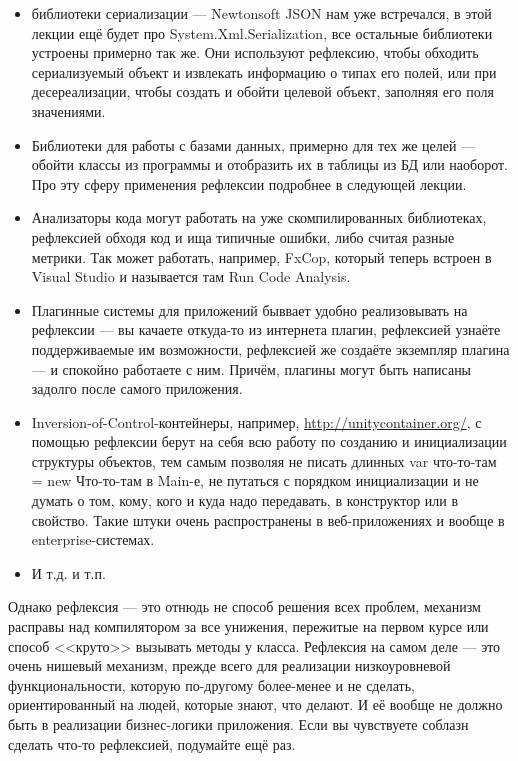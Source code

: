 \documentclass[a5paper]{article}
\begin{document}
\begin{itemize}
    \item библиотеки сериализации --- Newtonsoft JSON нам уже встречался, в этой лекции ещё будет про System.Xml.Serialization, все остальные библиотеки устроены примерно так же. Они используют рефлексию, чтобы обходить сериализуемый объект и извлекать информацию о типах его полей, или при десереализации, чтобы создать и обойти целевой объект, заполняя его поля значениями.
    \item Библиотеки для работы с базами данных, примерно для тех же целей --- обойти классы из программы и отобразить их в таблицы из БД или наоборот. Про эту сферу применения рефлексии подробнее в следующей лекции.
    \item Анализаторы кода могут работать на уже скомпилированных библиотеках, рефлексией обходя код и ища типичные ошибки, либо считая разные метрики. Так может работать, например, FxCop, который теперь встроен в Visual Studio и называется там Run Code Analysis.
    \item Плагинные системы для приложений быввает удобно реализовывать на рефлексии --- вы качаете откуда-то из интернета плагин, рефлексией узнаёте поддерживаемые им возможности, рефлексией же создаёте экземпляр плагина --- и спокойно работаете с ним. Причём, плагины могут быть написаны задолго после самого приложения.
    \item Inversion-of-Control-контейнеры, например, \url{http://unitycontainer.org/}, с помощью рефлексии берут на себя всю работу по созданию и инициализации структуры объектов, тем самым позволяя не писать длинных var что-то-там = new Что-то-там в Main-е, не путаться с порядком инициализации и не думать о том, кому, кого и куда надо передавать, в конструктор или в свойство. Такие штуки очень распространены в веб-приложениях и вообще в enterprise-системах.
    \item И т.д. и т.п.
\end{itemize}

Однако рефлексия --- это отнюдь не способ решения всех проблем, механизм расправы над компилятором за все унижения, пережитые на первом курсе или способ <<круто>> вызывать методы у класса. Рефлексия на самом деле --- это очень нишевый механизм, прежде всего для реализации низкоуровневой функциональности, которую по-другому более-менее и не сделать, ориентированный на людей, которые знают, что делают. И её вообще не должно быть в реализации бизнес-логики приложения. Если вы чувствуете соблазн сделать что-то рефлексией, подумайте ещё раз.
\end{document}
